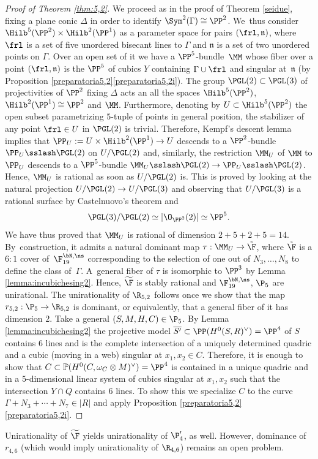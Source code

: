 \begin{proof}[Proof of Theorem \ref{thm:5,2}]
We proceed as in the proof of Theorem \ref{seidue}, fixing a plane conic $\Delta$ in order to identify $\Sym^2(\Gamma)\cong\PP^2$. We~thus consider $\Hilb^5({\PP^2})\times \Hilb^2(\PP^1)$ as a parameter space for pairs $(\frl,\mathfrak n)$, where $\frl$ is a set of five unordered bisecant lines to $\Gamma$ and $\mathfrak{n}$ is a set of two unordered points on $\Gamma$. Over an open set of it we have a $\PP^5$-bundle~$\MM$ whose fiber over a point $\left(\frl,\mathfrak{n} \right)$ is the $\PP^5$ of cubics $Y$ containing
$\Gamma \cup \frl$ and singular at~$\mathfrak{n}$ (by Proposition \ref{preparatoria5,2}\eqref{preparatoria5,2i}).
The group $\PGL(2)\subset \PGL(3)$ of projectivities of $\PP^2$ fixing $\Delta$ acts an all the spaces $\Hilb^5({\PP^2})$, $\Hilb^2(\PP^1)\cong \PP^2$ and $\MM$. Furthermore, denoting by $U\subset \Hilb^5({\PP^2})$ the open subset parametrizing $5$-tuple of points in general position, the stabilizer of any point $\frl\in U$ in $\PGL(2)$ is trivial. Therefore, Kempf's descent lemma implies that $\PP_U:=U\times \Hilb^2({\PP^1})\to U$ descends to a $\PP^2$-bundle $\PP_U\sslash\PGL(2)$ on $U/\PGL(2)$ and, similarly, the restriction $\MM_U$ of $\MM$ to $\PP_U$ descends to a $\PP^5$-bundle $\MM_U\sslash\PGL(2)\to \PP_U\sslash\PGL(2)$. Hence, $\MM_U$ is rational as soon as $U/\PGL(2)$ is. This is proved by looking at the natural projection $U/\PGL(2) \to U/ \PGL(3)$ and observing that $U/ \PGL(3)$ is a rational surface by Castelnuovo's theorem and
\[
\PGL(3)/\PGL(2)\simeq |\O_{\PP^2}(2)|\simeq \PP^5.
\]
We have thus proved that $\MM_U$ is rational of dimension
$2+5+2+5=14$.
By~construction, it admits a natural dominant map $\tau: \MM_U\to \tilde \F$, where $\tilde \F$ is a $6:1$ cover of~$\F_{19}^{\bN,\ns}$ corresponding to the selection of one out of $N_3,\ldots,N_8$ to define the class of~$\Gamma$. A~general fiber of $\tau$ is isomorphic to $\PP^3$ by Lemma \ref{lemma:incubichesing2}. Hence, $\widetilde \F$ is stably rational and $\F_{19}^{\bN,\ns}$, $\P_{5}$  are unirational. The unirationality of $\R_{5,2}$ follows once we show that the map $r_{5,2}:\P_{5} \to \R_{5,2}$ is dominant, or equivalently, that a general fiber of it has dimension $2$. Take a general $(S,M,H,C)\in \P_5$. By Lemma \ref{lemma:incubichesing2} the projective model $\overline{S'}\subset \PP(H^0(S,R)^\vee)=\PP^4$ of $S$ contains $6$ lines and is the complete intersection of a uniquely determined quadric and a cubic (moving in a web) singular at $x_1,x_2\in C$. Therefore, it is enough to show that $C\subset \mathbb P(H^0(C,\omega_C\otimes M)^\vee)=\PP^4$ is contained in a unique quadric and in a $5$-dimensional linear system of cubics singular at $x_1,x_2$ such that the intersection $Y\cap Q$ contains $6$ lines. To show this we specialize $C$ to the curve $\Gamma+N_3+\cdots +N_7\in |R|$ and apply Proposition \ref{preparatoria5,2}\eqref{preparatoria5,2i}.
\end{proof}
\begin{remark}
Unirationality of $\widetilde \F$ yields unirationality of $\P_4'$, as well. However, dominance of $r_{4,6}$ (which would imply unirationality of $\R_{4,6}$) remains an open problem.
\end{remark}

